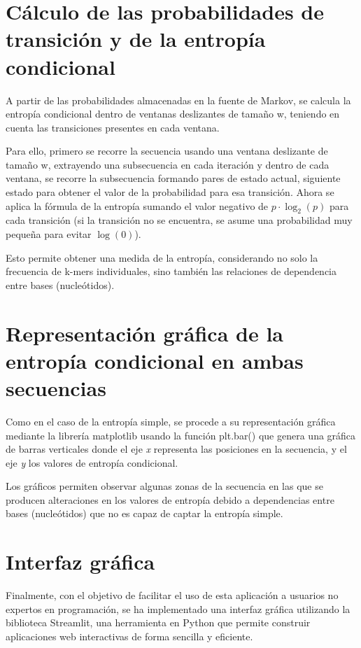 \documentclass[11pt,spanish,listoffigures,listoftables]{tfgetsinf}
\begin{document}
\section{Cálculo de las probabilidades de transición y de la entropía condicional}

A partir de las probabilidades almacenadas en la fuente de Markov, se calcula la entropía condicional dentro de ventanas deslizantes de tamaño w, teniendo en cuenta las transiciones presentes en cada ventana. 

Para ello, primero se recorre la secuencia usando una ventana deslizante de tamaño w, extrayendo una subsecuencia en cada iteración y dentro de cada ventana, se recorre la subsecuencia formando pares de estado actual, siguiente estado para obtener el valor de la probabilidad para esa transición. Ahora se aplica la fórmula de la entropía sumando el valor negativo de $p \cdot \log_2(p)$ para cada transición (si la transición no se encuentra, se asume una probabilidad muy pequeña para evitar $\log(0)$).


Esto permite obtener una medida de la entropía, considerando no solo la frecuencia de k-mers individuales, sino también las relaciones de dependencia entre bases (nucleótidos). 

\section{Representación gráfica de la entropía condicional en ambas secuencias}

Como en el caso de la entropía simple, se procede a su representación gráfica mediante la librería matplotlib usando la función plt.bar() que genera una gráfica de barras verticales donde el eje \textit{x} representa las posiciones en la secuencia, y el eje \textit{y} los valores de entropía condicional.

Los gráficos permiten observar algunas zonas de la secuencia en las que se producen alteraciones en los valores de entropía debido a dependencias entre bases (nucleótidos) que no es capaz de captar la entropía simple. 


\section{Interfaz gráfica}

Finalmente, con el objetivo de facilitar el uso de esta aplicación a usuarios no expertos en programación, se ha implementado una interfaz gráfica utilizando la biblioteca Streamlit, una herramienta en Python que permite construir aplicaciones web interactivas de forma sencilla y eficiente. 
\end{document}
